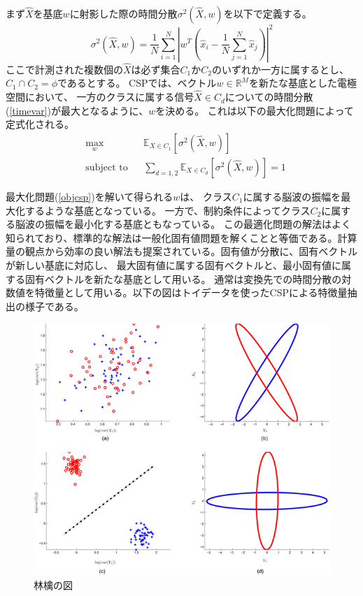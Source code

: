 まず\(\hat X\)を基底\(w\)に射影した際の時間分散\(\sigma^2 (\hat X, w)\)を以下で定義する。
\begin{equation}
    \sigma^2 (\hat X, w)  = \frac{1}{N}\sum_{i=1}^N \left|w^T \left(\hat x_i - \frac{1}{N} \sum_{j=1}^N \hat x_j \right) \right|^2
    \label{timevar}
\end{equation}
ここで計測された複数個の\(\hat X\)は必ず集合\(C_1\)か\(C_2\)のいずれか一方に属するとし、
\(C_1 \cap C_2 = \phi \)であるとする。
CSPでは、ベクトル\(w \in \mathbb {R}^M\)を新たな基底とした電極空間において、
一方のクラスに属する信号\(\hat X \in {C_d}\)についての時間分散(\ref{timevar})が最大となるように、\(w\)を決める。
これは以下の最大化問題によって定式化される。
\begin{equation}
    \begin{aligned}
    & \max_w
    & & \mathbb E_{X \in C_1} \left[\sigma^2 (\hat X, w) \right] \\
    & \text{subject to}
    & &  \sum_{d=1,2} \mathbb E_{X \in C_d} \left[\sigma^2 (\hat X, w) \right] = 1
    \end{aligned}
    \label{objcsp}
\end{equation}

最大化問題(\ref{objcsp})を解いて得られる\(w\)は、
クラス\(C_1\)に属する脳波の振幅を最大化するような基底となっている。
一方で、制約条件によってクラス\(C_2\)に属する脳波の振幅を最小化する基底ともなっている。
この最適化問題の解法はよく知られており、標準的な解法は一般化固有値問題を解くことと等価である。計算量の観点から効率の良い解法も提案されている。固有値が分散に、固有ベクトルが新しい基底に対応し、
最大固有値に属する固有ベクトルと、最小固有値に属する固有ベクトルを新たな基底として用いる。
通常は変換先での時間分散の対数値を特徴量として用いる。以下の図はトイデータを使ったCSPによる特徴量抽出の様子である。

\begin{figure}
    \centering
    \includegraphics[width=12cm]{images/apple.png}
    \caption{林檎の図}
\end{figure}
  


